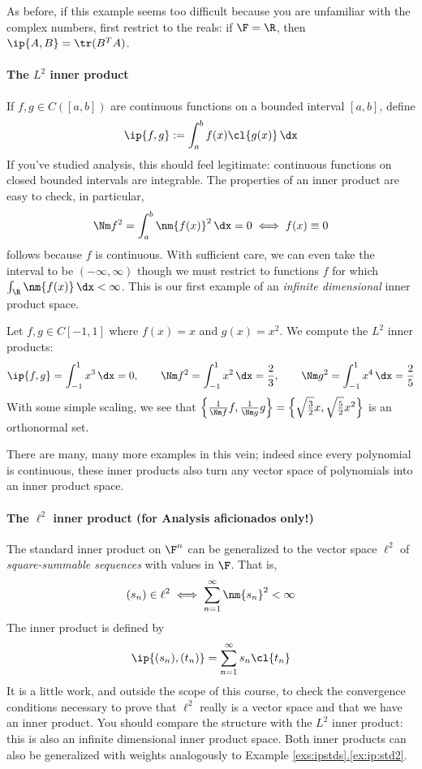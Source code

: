 As before, if this example seems too difficult because you are unfamiliar with the complex numbers, first restrict to the reals: if $\F=\R$, then $\ip{A,B}=\tr(B^TA)$.



\paragraph{The $L^2$ inner product}

If $f,g\in C([a,b])$ are continuous functions on a bounded interval $[a,b]$, define
\[\ip{f,g}:=\int_a^b f(x)\cl{g(x)}\,\dx\]
If you've studied analysis, this should feel legitimate: continuous functions on closed bounded intervals are integrable. The properties of an inner product are easy to check, in particular,
\[\Nm f^2=\int_a^b\nm{f(x)}^2\,\dx=0\iff f(x)\equiv 0\]
follows because $f$ is continuous. With sufficient care, we can even take the interval to be $(-\infty,\infty)$  though we must restrict to functions $f$ for which $\int_\R\nm{f(x)}\,\dx<\infty$. This is our first example of an \emph{infinite dimensional} inner product space.  %

\begin{example}{}{}
Let $f,g\in C[-1,1]$ where $f(x)=x$ and $g(x)=x^2$. We compute the $L^2$ inner products:
\[\ip{f,g}=\int_{-1}^1x^3\,\dx=0,\qquad \Nm f^2=\int_{-1}^1x^2\,\dx=\frac 23,\qquad \Nm g^2=\int_{-1}^1x^4\,\dx=\frac 25\]
With some simple scaling, we see that $\left\{\frac 1{\Nm f}f,\frac 1{\Nm g}g\right\}=\left\{\sqrt{\frac 32}x,\sqrt{\frac 52}x^2\right\}$ is an orthonormal set.
\end{example}

There are many, many more examples in this vein; indeed since every polynomial is continuous, these inner products also turn any vector space of polynomials into an inner product space.


\paragraph{The $\ell^2$ inner product (for Analysis aficionados only!)}\label{ell2ip}

The standard inner product on $\F^n$ can be generalized to the vector space $\ell^2$ of \emph{square-summable sequences} with values in $\F$. That is,
\[(s_n)\in \ell^2\iff \sum_{n=1}^\infty\nm{s_n}^2<\infty\]
The inner product is defined by
\[\ip{(s_n),(t_n)}=\sum_{n=1}^\infty s_n\cl{t_n}\]
It is a little work, and outside the scope of this course, to check the convergence conditions necessary to prove that $\ell^2$ really is a vector space and that we have an inner product. You should compare the structure with the $L^2$ inner product: this is also an infinite dimensional inner product space. Both inner products can also be generalized with weights analogously to Example \hyperref[ex:ip:std2]{\ref*{exs:ipstds}.\ref*{ex:ip:std2}}.

